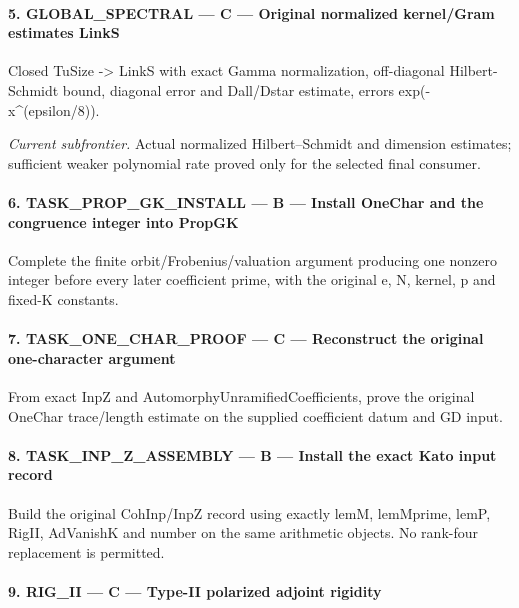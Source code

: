 \paragraph{5. GLOBAL\_\allowbreak{}SPECTRAL — C — Original normalized kernel/\allowbreak{}Gram estimates LinkS}

Closed TuSize -> LinkS with exact Gamma normalization, off-diagonal Hilbert-Schmidt bound, diagonal error and Dall/\allowbreak{}Dstar estimate, errors exp(-x\textasciicircum{}(epsilon/\allowbreak{}8)).


\emph{Current subfrontier.} Actual normalized Hilbert–Schmidt and dimension estimates; sufficient weaker polynomial rate proved only for the selected final consumer.


\paragraph{6. TASK\_\allowbreak{}PROP\_\allowbreak{}GK\_\allowbreak{}INSTALL — B — Install OneChar and the congruence integer into PropGK}

Complete the finite orbit/\allowbreak{}Frobenius/\allowbreak{}valuation argument producing one nonzero integer before every later coefficient prime, with the original e,\allowbreak{} N,\allowbreak{} kernel,\allowbreak{} p and fixed-K constants.


\paragraph{7. TASK\_\allowbreak{}ONE\_\allowbreak{}CHAR\_\allowbreak{}PROOF — C — Reconstruct the original one-character argument}

From exact InpZ and AutomorphyUnramifiedCoefficients, prove the original OneChar trace/\allowbreak{}length estimate on the supplied coefficient datum and GD input.


\paragraph{8. TASK\_\allowbreak{}INP\_\allowbreak{}Z\_\allowbreak{}ASSEMBLY — B — Install the exact Kato input record}

Build the original CohInp/\allowbreak{}InpZ record using exactly lemM,\allowbreak{} lemMprime,\allowbreak{} lemP,\allowbreak{} RigII,\allowbreak{} AdVanishK and number on the same arithmetic objects. No rank-four replacement is permitted.


\paragraph{9. RIG\_\allowbreak{}II — C — Type-II polarized adjoint rigidity}


